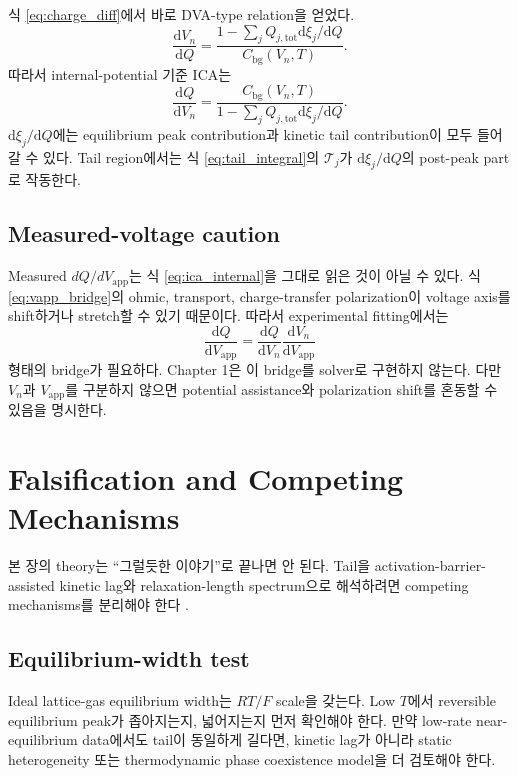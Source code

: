 \documentclass[11pt]{article}
\newcommand{\dd}{\mathrm{d}}
\newcommand{\app}{\mathrm{app}}
\newcommand{\bg}{\mathrm{bg}}
\newcommand{\tot}{\mathrm{tot}}
\begin{document}
식 \eqref{eq:charge_diff}에서 바로 DVA-type relation을 얻었다.
\[
\frac{\dd V_n}{\dd Q}
=
\frac{
1-\sum_j Q_{j,\tot}\dd\xi_j/\dd Q
}{
C_{\bg}(V_n,T)
}.
\]
따라서 internal-potential 기준 ICA는
\begin{equation}
\boxed{
\frac{\dd Q}{\dd V_n}
=
\frac{
C_{\bg}(V_n,T)
}{
1-\sum_j Q_{j,\tot}\dd\xi_j/\dd Q
}.
}
\label{eq:ica_internal}
\end{equation}
\(\dd\xi_j/\dd Q\)에는 equilibrium peak contribution과 kinetic tail contribution이 모두 들어갈 수
있다. Tail region에서는 식 \eqref{eq:tail_integral}의 \(\mathcal T_j\)가
\(\dd\xi_j/\dd Q\)의 post-peak part로 작동한다.

\subsection{Measured-voltage caution}\label{subsec:measured_voltage}

Measured \(dQ/dV_{\app}\)는 식 \eqref{eq:ica_internal}을 그대로 읽은 것이 아닐 수 있다. 식
\eqref{eq:vapp_bridge}의 ohmic, transport, charge-transfer polarization이 voltage axis를 shift하거나
stretch할 수 있기 때문이다. 따라서 experimental fitting에서는
\[
\frac{\dd Q}{\dd V_{\app}}
=
\frac{\dd Q}{\dd V_n}
\frac{\dd V_n}{\dd V_{\app}}
\]
형태의 bridge가 필요하다. Chapter 1은 이 bridge를 solver로 구현하지 않는다. 다만 \(V_n\)과
\(V_{\app}\)를 구분하지 않으면 potential assistance와 polarization shift를 혼동할 수 있음을 명시한다.

\section{Falsification and Competing Mechanisms}\label{sec:falsification}

본 장의 theory는 ``그럴듯한 이야기''로 끝나면 안 된다. Tail을 activation-barrier-assisted kinetic
lag와 relaxation-length spectrum으로 해석하려면 competing mechanisms를 분리해야 한다
\cite{dubarry2022,fly2020}.

\subsection{Equilibrium-width test}\label{subsec:eq_width_test}

Ideal lattice-gas equilibrium width는 \(RT/F\) scale을 갖는다. Low \(T\)에서 reversible equilibrium
peak가 좁아지는지, 넓어지는지 먼저 확인해야 한다. 만약 low-rate near-equilibrium data에서도 tail이
동일하게 길다면, kinetic lag가 아니라 static heterogeneity 또는 thermodynamic phase coexistence
model을 더 검토해야 한다.
\end{document}
